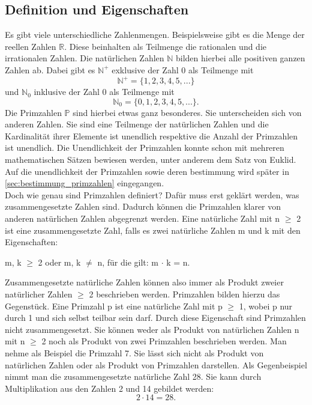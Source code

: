 \subsection{Definition und Eigenschaften}
Es gibt viele unterschiedliche Zahlenmengen. Beispielsweise gibt es die Menge der reellen Zahlen $\mathbb{R}$. Diese beinhalten als Teilmenge die rationalen und die irrationalen Zahlen. Die natürlichen Zahlen $\mathbb{N}$ bilden hierbei alle positiven ganzen Zahlen ab. Dabei gibt es $\mathbb{N^{+}}$ exklusive der Zahl 0 als Teilmenge mit \[\mathbb{N^{+}} = \{1, 2, 3, 4, 5, ...\}\] und $\mathbb{N}_0$ inklusive der Zahl 0 als Teilmenge mit \[\mathbb{N}_0 = \{0, 1, 2, 3, 4, 5, ...\}.\] Die Primzahlen $\mathbb{P}$ sind hierbei etwas ganz besonderes. Sie unterscheiden sich von anderen Zahlen. Sie sind eine Teilmenge der natürlichen Zahlen und die Kardinalität ihrer Elemente ist unendlich respektive die Anzahl der Primzahlen ist unendlich. Die Unendlichkeit der Primzahlen konnte schon mit mehreren mathematischen Sätzen bewiesen werden, unter anderem dem Satz von Euklid. Auf die unendlichkeit der Primzahlen sowie deren bestimmung wird später in \ref{sec:bestimmung_primzahlen} eingegangen.\\

Doch wie genau sind Primzahlen definiert? Dafür muss erst geklärt werden, was zusammengesetzte Zahlen sind. Dadurch können die Primzahlen klarer von anderen natürlichen Zahlen abgegrenzt werden. Eine natürliche Zahl mit n $\geq$ 2 ist eine zusammengesetzte Zahl, falls es zwei natürliche Zahlen m und k mit den Eigenschaften:

\begin{center}
 m, k $\geq$ 2 oder m, k $\neq$ n, für die gilt: m $\cdot$ k = n. 
\end{center}
 
Zusammengesetzte natürliche Zahlen können also immer als Produkt zweier natürlicher Zahlen $\geq$ 2 beschrieben werden. Primzahlen bilden hierzu das Gegenstück. Eine Primzahl p ist eine natürliche Zahl mit p $\geq$ 1, wobei p nur durch 1 und sich selbst teilbar sein darf. Durch diese Eigenschaft sind Primzahlen nicht zusammengesetzt. Sie können weder als Produkt von natürlichen Zahlen n mit n $\geq$ 2 noch als Produkt von zwei Primzahlen beschrieben werden. Man nehme als Beispiel die Primzahl 7. Sie lässt sich nicht als Produkt von natürlichen Zahlen oder als Produkt von Primzahlen darstellen. Als Gegenbeispiel nimmt man die zusammengesetzte natürliche Zahl 28. Sie kann durch Multiplikation aus den Zahlen 2 und 14 gebildet werden: \[2 \cdot 14=28.\]

